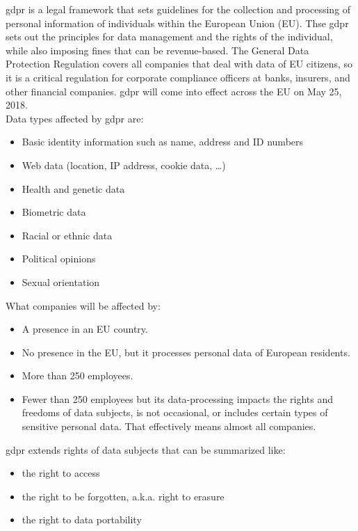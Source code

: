 \documentclass[thesis=M,english]{FITthesis}[2012/06/26]
\begin{document}
\acrshort{gdpr}\cite{gdpr_info} is a legal framework that sets guidelines for the collection and processing of personal information of individuals within the European Union (EU). Thse \acrshort{gdpr} sets out the principles for data management and the rights of the individual, while also imposing fines that can be revenue-based. The General Data Protection Regulation covers all companies that deal with data of EU citizens, so it is a critical regulation for corporate compliance officers at banks, insurers, and other financial companies. \acrshort{gdpr} will come into effect across the EU on May 25, 2018.\\

Data types affected by \acrshort{gdpr} are:
\begin{itemize}[nosep]
\item Basic identity information such as name, address and ID numbers
\item Web data (location, IP address, cookie data, \dots)
\item Health and genetic data
\item Biometric data
\item Racial or ethnic data
\item Political opinions
\item Sexual orientation\\
\end{itemize}

What companies will be affected by:
\begin{itemize}[nosep]
	\item A presence in an EU country.
	\item No presence in the EU, but it processes personal data of European residents.
	\item More than 250 employees.
	\item Fewer than 250 employees but its data-processing impacts the rights and freedoms of data subjects, is not occasional, or includes certain types of sensitive personal data. That effectively means almost all companies.\\
\end{itemize}

\acrshort{gdpr} extends rights of data subjects that can be summarized like:
\begin{itemize}[nosep]
\item the right to access
\item the right to be forgotten, a.k.a. right to erasure
\item the right to data portability\\
\end{itemize}
\end{document}
